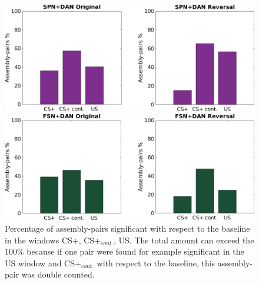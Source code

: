  \begin{figure}
    \centering
    \includegraphics[scale=0.36]{figures/SPN_DANHisto.pdf}
    
    \vspace{1cm}
    
    \includegraphics[scale=0.36]{figures/FSN_DANHisto.pdf}
\caption{Percentage of assembly-pairs significant with respect to the baseline in the windows CS+, CS+$_{cont.}$, US. The total amount can exceed the $100\%$ because if  one pair were found for example significant in the US window and CS+$_{cont.}$ with respect to the baseline, this assembly-pair was double counted.}
    \label{fig:FriedHistoDAN}
\end{figure}
